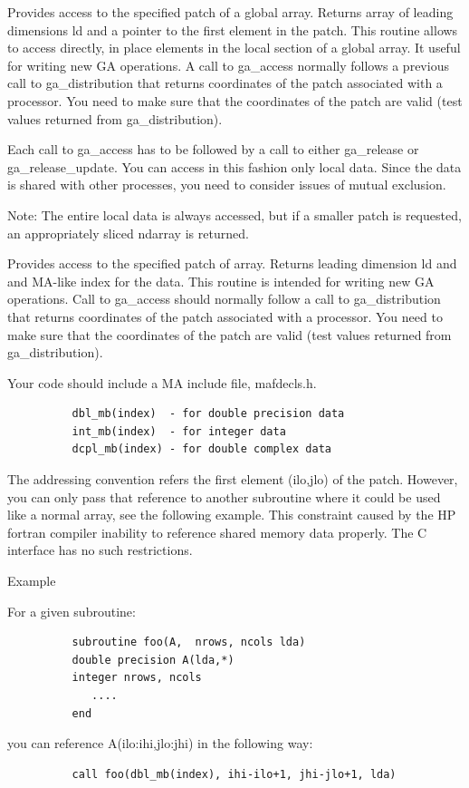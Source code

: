 \documentclass[10pt]{article}
\begin{document}
\begin{desc}

Provides access to the specified patch of a global array. Returns array of
leading dimensions ld and a pointer to the first element in the patch.  This
routine allows to access directly, in place elements in the local section of a
global array. It useful for writing new GA operations. A call to ga_access
normally follows a previous call to ga_distribution that returns coordinates of
the patch associated with a processor. You need to make sure that the
coordinates of the patch are valid (test values returned from ga_distribution).

Each call to ga_access has to be followed by a call to either ga_release or
ga_release_update. You can access in this fashion only local data.  Since the
data is shared with other processes, you need to consider issues of mutual
exclusion.

\end{desc}

\begin{pydesc}
Note: The entire local data is always accessed, but if a smaller patch is
requested, an appropriately sliced ndarray is returned.
\end{pydesc}

\begin{fdesc}

Provides access to the specified patch of array. Returns leading dimension ld
and and MA-like index for the data. This routine is intended for writing new GA
operations. Call to ga_access should normally follow a call to ga_distribution
that returns coordinates of the patch associated with a processor. You need to
make sure that the coordinates of the patch are valid (test values returned
from ga_distribution).

Your code should include a MA include file, mafdecls.h.
\begin{verbatim}
          dbl_mb(index)  - for double precision data
          int_mb(index)  - for integer data
          dcpl_mb(index) - for double complex data
\end{verbatim}

The addressing convention refers the first element (ilo,jlo) of the patch.
However, you can only pass that reference to another subroutine where it could
be used like a normal array, see the following example. This constraint caused
by the HP fortran compiler inability to reference shared memory data properly.
The C interface has no such restrictions.

Example

For a given subroutine:
\begin{verbatim}
          subroutine foo(A,  nrows, ncols lda)
          double precision A(lda,*)
          integer nrows, ncols
             ....
          end
\end{verbatim}
you can reference A(ilo:ihi,jlo:jhi) in the following way:

\begin{verbatim}
          call foo(dbl_mb(index), ihi-ilo+1, jhi-jlo+1, lda)
\end{verbatim}

\end{fdesc}
\end{document}
